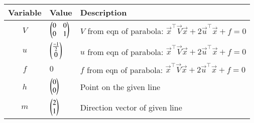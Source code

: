 \begin{tabular}{|c|p{1cm}|p{7cm}|}
    \hline
	Variable  &  Value & Description\\
    \hline
        $V$ &  $\begin{pmatrix}0&0\\0&1\end{pmatrix}$ & $V$ from eqn of parabola: $\vec{x}^\top\vec{V}\vec{x} + 2\vec{u}^\top\vec{x} + f = 0$\\
    \hline
        $u$ & $\begin{pmatrix}\frac{-1}{2}\\0\end{pmatrix}$ & $u$ from eqn of parabola: $\vec{x}^\top\vec{V}\vec{x} + 2\vec{u}^\top\vec{x} + f = 0$\\
    \hline
	$f$ &   $0$ & $f$ from eqn of parabola: $\vec{x}^\top\vec{V}\vec{x} + 2\vec{u}^\top\vec{x} + f = 0$\\
    \hline 
	$h$ &  $\begin{pmatrix}0\\0\end{pmatrix}$ & Point on the given line\\
    \hline
        $m$ &  $\begin{pmatrix}2 \\ 1\end{pmatrix}$ & Direction vector of given line\\
    \hline	
\end{tabular}
